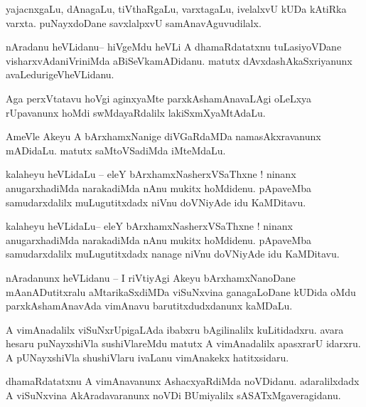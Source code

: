 \documentclass{article}
\begin{document}
\begin{mn}%
yajacnxgaLu, dAnagaLu, tiVthaRgaLu, varxtagaLu, ivelalxvU kUDa kAtiRka varxta. puNayxdoDane 
savxlalpxvU samAnavAguvudilalx.
\end{mn}

\begin{mn}%
nAradanu heVLidanu-- hiVgeMdu heVLi A dhamaRdatatxnu tuLasiyoVDane visharxvAdaniVriniMda 
aBiSeVkamADidanu. matutx dAvxdashAkaSxriyanunx avaLedurigeVheVLidanu.
\end{mn}

\begin{mn}%
Aga perxVtatavu hoVgi aginxyaMte parxkAshamAnavaLAgi oLeLxya rUpavanunx hoMdi swMdayaRdalilx 
lakiSxmXyaMtAdaLu.
\end{mn}

\begin{mn}%
AmeVle Akeyu A bArxhamxNanige diVGaRdaMDa namasAkxravanunx mADidaLu. matutx saMtoVSadiMda iMteMdaLu.
\end{mn}

\begin{mn}%
kalaheyu heVLidaLu -- eleY bArxhamxNasherxVSaThxne ! ninanx anugarxhadiMda narakadiMda nAnu mukitx 
hoMdidenu. pApaveMba samudarxdalilx muLugutitxdadx niVnu doVNiyAde idu KaMDitavu.
\end{mn}

\begin{mn}%
kalaheyu heVLidaLu-- eleY bArxhamxNasherxVSaThxne ! ninanx anugarxhadiMda narakadiMda nAnu mukitx 
hoMdidenu. pApaveMba samudarxdalilx muLugutitxdadx nanage niVnu doVNiyAde idu KaMDitavu.
\end{mn}

\begin{mn}%
nAradanunx heVLidanu -- I riVtiyAgi Akeyu bArxhamxNanoDane mAanADutitxralu aMtarikaSxdiMDa 
viSuNxvina ganagaLoDane kUDida oMdu parxkAshamAnavAda vimAnavu barutitxdudxdanunx kaMDaLu.
\end{mn}

\begin{mn}%
A vimAnadalilx viSuNxrUpigaLAda ibabxru bAgilinalilx kuLitidadxru. avara hesaru puNayxshiVla 
sushiVlareMdu matutx A vimAnadalilx apasxrarU idarxru. A pUNayxshiVla shushiVlaru ivaLanu 
vimAnakekx hatitxsidaru.
\end{mn}

\begin{mn}%
dhamaRdatatxnu A vimAnavanunx AshacxyaRdiMda noVDidanu. adaralilxdadx A viSuNxvina AkAradavaranunx 
noVDi BUmiyalilx sASATxMgaveragidanu.
\end{mn}
\end{document}
